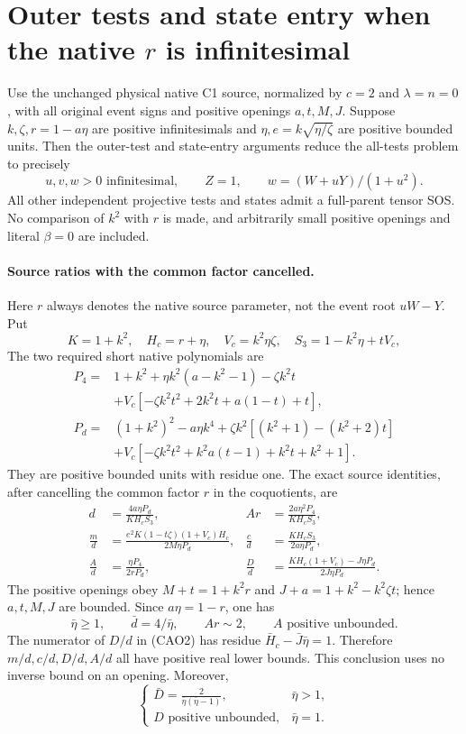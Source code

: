 \section[Outer tests and state entry when the native r is infinitesimal]{Outer tests and state entry when the native $r$ is infinitesimal}
\label{sec:centered-a-outer}

\begin{lemma}
Use the unchanged physical native C1 source, normalized by $c=2$ and
$\lambda=n=0$, with all original event signs and positive openings
$a,t,M,J$. Suppose $k,\zeta,r=1-a\eta$ are positive infinitesimals and
$\eta,e=k\sqrt{\eta/\zeta}$ are positive bounded units.
Then the outer-test and state-entry arguments reduce the all-tests
problem to precisely
\[
 u,v,w>0\text{ infinitesimal},\qquad Z=1,
 \qquad w=(W+uY)/(1+u^2).
 \tag{CAO1}
\]
All other independent projective tests and states admit a full-parent
tensor SOS. No comparison of $k^2$ with $r$ is made, and arbitrarily
small positive openings and literal $\beta=0$ are included.
\end{lemma}

\paragraph{Source ratios with the common factor cancelled.}
Here $r$ always denotes the native source parameter, not the event root
$uW-Y$. Put
\[
 K=1+k^2,\quad H_c=r+\eta,\quad V_c=k^2\eta\zeta,\quad
 S_3=1-k^2\eta+tV_c,
\]
The two required short native polynomials are
\begin{align*}
P_4={}&1+k^2+\eta k^2(a-k^2-1)-\zeta k^2t\\
 &+V_c[-\zeta k^2t^2+2k^2t+a(1-t)+t],\\
P_d={}&(1+k^2)^2-a\eta k^4
 +\zeta k^2[(k^2+1)-(k^2+2)t]\\
 &+V_c[-\zeta k^2t^2+k^2a(t-1)+k^2t+k^2+1].
\end{align*}
They are positive bounded units with residue one. The exact source
identities, after cancelling the common factor $r$ in the coquotients,
are
\begin{align*}
 d&=\frac{4a\eta P_d}{KH_cS_3},&
 Ar&=\frac{2a\eta^2P_4}{KH_cS_3},\\
 \frac md&=\frac{e^2K(1-t\zeta)(1+V_c)H_c}{2M\eta P_d},&
 \frac cd&=\frac{KH_cS_3}{2a\eta P_d},\\
 \frac Ad&=\frac{\eta P_4}{2rP_d},&
 \frac Dd&=\frac{KH_c(1+V_c)-J\eta P_d}{2J\eta P_d}.
 \tag{CAO2}
\end{align*}
The positive openings obey
$M+t=1+k^2r$ and $J+a=1+k^2-k^2\zeta t$; hence $a,t,M,J$ are
bounded. Since $a\eta=1-r$, one has
\[
 \bar\eta\ge1,\qquad \bar d=4/\bar\eta,\qquad Ar\sim2,
 \qquad A\text{ positive unbounded}.
 \tag{CAO3}
\]
The numerator of $D/d$ in (CAO2) has residue
$\bar H_c-\bar J\bar\eta=1$. Therefore $m/d,c/d,D/d,A/d$ all have
positive real lower bounds. This conclusion uses no inverse bound on
an opening. Moreover,
\[
 \begin{cases}
 \displaystyle \bar D=\frac{2}{\bar\eta(\bar\eta-1)},
       &\bar\eta>1,\\[4pt]
 D\text{ positive unbounded},&\bar\eta=1.
 \end{cases}
 \tag{CAO4}
\]

